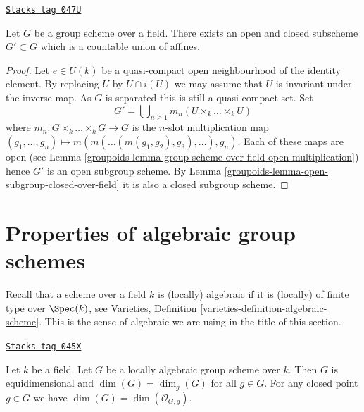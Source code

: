 \begin{lemma}
\label{groupoids-lemma-group-scheme-field-countable-affine}
\href{https://stacks.math.columbia.edu/tag/047U}{\texttt{Stacks tag 047U}}

Let $G$ be a group scheme over a field.
There exists an open and closed subscheme $G' \subset G$
which is a countable union of affines.
\end{lemma}

\begin{proof}

Let $e \in U(k)$ be a quasi-compact open neighbourhood of the identity
element. By replacing $U$ by $U \cap i(U)$ we may assume that
$U$ is invariant under the inverse map. As $G$ is separated this is
still a quasi-compact set. Set
$$
G' = \bigcup\nolimits_{n \geq 1} m_n(U \times_k \ldots \times_k U)
$$
where $m_n : G \times_k \ldots \times_k G \to G$ is the $n$-slot
multiplication map
$(g_1, \ldots, g_n) \mapsto m(m(\ldots (m(g_1, g_2), g_3), \ldots ), g_n)$.
Each of these maps are open (see
Lemma \ref{groupoids-lemma-group-scheme-over-field-open-multiplication})
hence $G'$ is an open subgroup scheme. By
Lemma \ref{groupoids-lemma-open-subgroup-closed-over-field}
it is also a closed subgroup scheme.
\end{proof}

\section{Properties of algebraic group schemes}
\label{groupoids-section-algebraic-group-schemes}
Recall that a scheme over a field $k$ is (locally) algebraic if it is
(locally) of finite type over $\Spec(k)$, see
Varieties, Definition \ref{varieties-definition-algebraic-scheme}.
This is the sense of algebraic we are using in the title of this section.

\begin{lemma}
\label{groupoids-lemma-group-scheme-finite-type-field}
\href{https://stacks.math.columbia.edu/tag/045X}{\texttt{Stacks tag 045X}}

Let $k$ be a field. Let $G$ be a locally algebraic group scheme over $k$.
Then $G$ is equidimensional and $\dim(G) = \dim_g(G)$ for all $g \in G$.
For any closed point $g \in G$ we have $\dim(G) = \dim(\mathcal{O}_{G, g})$.
\end{lemma}

